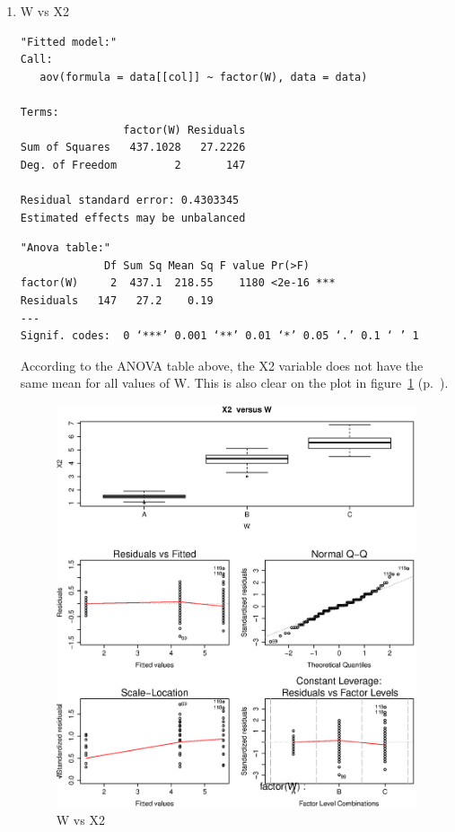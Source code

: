 \documentclass{article}
\begin{document}
\begin{enumerate}
  \item W vs X2
  \begin{lstlisting}
"Fitted model:"
Call:
   aov(formula = data[[col]] ~ factor(W), data = data)

Terms:
                factor(W) Residuals
Sum of Squares   437.1028   27.2226
Deg. of Freedom         2       147

Residual standard error: 0.4303345
Estimated effects may be unbalanced
  \end{lstlisting}

  \begin{lstlisting}
"Anova table:"
             Df Sum Sq Mean Sq F value Pr(>F)    
factor(W)     2  437.1  218.55    1180 <2e-16 ***
Residuals   147   27.2    0.19                   
---
Signif. codes:  0 ‘***’ 0.001 ‘**’ 0.01 ‘*’ 0.05 ‘.’ 0.1 ‘ ’ 1
  \end{lstlisting}
  
  According to the ANOVA table above, the X2 variable does not have the same
  mean for all values of W. This is also clear on the plot in
  figure~\ref{fig:X2vsW} (p.~\pageref{fig:X2vsW}).
  
  \begin{figure}[H]
  \centering
  \includegraphics[scale=0.6]{X2vsW.eps}
  \caption{W vs X2}
  \label{fig:X2vsW}
  \end{figure}
  

\end{enumerate}
\end{document}
